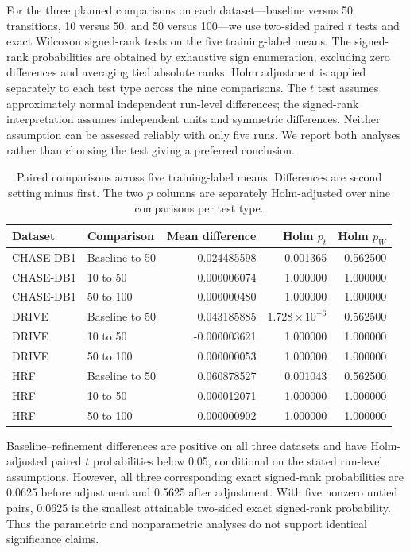\documentclass[jimaging,article,submit,pdftex,moreauthors]
  {Definitions/mdpi}
\begin{document}
For the three planned comparisons on each dataset---baseline versus 50 transitions, 10 versus 50, and 50 versus 100---we use two-sided paired $t$ tests and exact Wilcoxon signed-rank tests on the five training-label means. The signed-rank probabilities are obtained by exhaustive sign enumeration, excluding zero differences and averaging tied absolute ranks. Holm adjustment is applied separately to each test type across the nine comparisons. The $t$ test assumes approximately normal independent run-level differences; the signed-rank interpretation assumes independent units and symmetric differences. Neither assumption can be assessed reliably with only five runs. We report both analyses rather than choosing the test giving a preferred conclusion.

\begin{table}[htbp]
\centering
\caption{Paired comparisons across five training-label means. Differences are second setting minus first. The two $p$ columns are separately Holm-adjusted over nine comparisons per test type.}
\label{tab:uploaded_training_paired_tests}
\scriptsize
\begin{tabular}{llrrr}
\toprule
Dataset & Comparison & Mean difference & Holm $p_t$ & Holm $p_W$ \\
\midrule
CHASE-DB1 & Baseline to 50 & 0.024485598 & 0.001365 & 0.562500 \\
CHASE-DB1 & 10 to 50 & 0.000006074 & 1.000000 & 1.000000 \\
CHASE-DB1 & 50 to 100 & 0.000000480 & 1.000000 & 1.000000 \\
DRIVE & Baseline to 50 & 0.043185885 & $1.728\times10^{-6}$ & 0.562500 \\
DRIVE & 10 to 50 & -0.000003621 & 1.000000 & 1.000000 \\
DRIVE & 50 to 100 & 0.000000053 & 1.000000 & 1.000000 \\
HRF & Baseline to 50 & 0.060878527 & 0.001043 & 0.562500 \\
HRF & 10 to 50 & 0.000012071 & 1.000000 & 1.000000 \\
HRF & 50 to 100 & 0.000000902 & 1.000000 & 1.000000 \\
\bottomrule
\end{tabular}
\end{table}

Baseline--refinement differences are positive on all three datasets and have Holm-adjusted paired $t$ probabilities below 0.05, conditional on the stated run-level assumptions. However, all three corresponding exact signed-rank probabilities are 0.0625 before adjustment and 0.5625 after adjustment. With five nonzero untied pairs, 0.0625 is the smallest attainable two-sided exact signed-rank probability. Thus the parametric and nonparametric analyses do not support identical significance claims.
\end{document}
